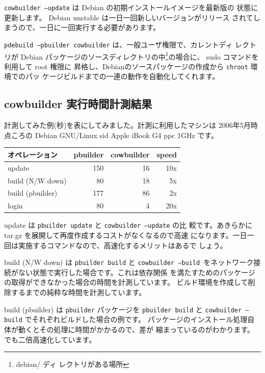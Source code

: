 \documentclass[mingoth,a4paper]{jsarticle}
\begin{document}
{\tt cowbuilder --update} は Debian の初期インストールイメージを最新版の
状態に更新します。 Debian unstable は一日一回新しいバージョンがリリース
されてしまうので、一日に一回実行する必要があります。

{\tt pdebuild --pbuilder cowbuilder} は、一般ユーザ権限で、カレントディ
レクトリが Debian パッケージのソースディレクトリの中\footnote{debian/ ディ
レクトリがある場所}の場合に、 sudo コマンドを利用して root 権限に
昇格し、Debianのソースパッケージの作成から \texttt{chroot} 環境でのパッ
ケージビルドまでの一連の動作を自動化してくれます。

\subsection{cowbuilder 実行時間計測結果}

計測してみた例(秒)を表にしてみました。計測に利用したマシンは 2006年5月時
点ころの Debian GNU/Linux sid Apple iBook G4 ppc 1GHz です。

\begin{center}
 \begin{tabular}[t]{@{\vrule width 1pt}l|r|r|r@{\ \vrule width 1pt}}
 \hline
 \hline
 オペレーション & pbuilder & cowbuilder & speed \\
 \hline
 update & 150  & 16 & 10x \\
 build (N/W down) & 80 & 18 & 5x \\
 build (pbuilder) & 177 & 86 & 2x\\
 login & 80 & 4 & 20x\\
 \hline
 \hline
 \end{tabular}
\end{center}

update は \texttt{pbuilder update} と \texttt{cowbuilder --update} の比
較です。あきらかに tar.gz を展開して再度作成するコストがなくなるので高速
になります。一日一回は実施するコマンドなので、高速化するメリットはあるで
しょう。

build (N/W down) は \texttt{pbuilder build} と \texttt{cowbuilder
--build }をネットワーク接続がない状態で実行した場合です。これは依存関係
を満たすためのパッケージの取得ができなかった場合の時間を計測しています。 
ビルド環境を作成して削除するまでの純粋な時間を計測しています。

build (pbuilder) は \texttt{pbuilder} パッケージを \texttt{pbuilder
build} と \texttt{cowbuilder --build} でそれぞれビルドした場合の例です。
パッケージのインストール処理自体が動くとその処理に時間がかかるので、差が
縮まっているのがわかります。でも二倍高速化しています。
\end{document}
